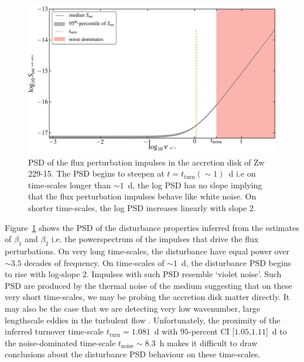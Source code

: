\documentclass[a4paper,fleqn,usenatbib]{mnras}
\begin{document}
\begin{figure}
    \includegraphics[width=\columnwidth]{images/Zw229-15_distPSD.jpg}
    \caption{PSD of the flux perturbation impulses in the accretion disk of Zw 229-15. The PSD begins to steepen at $t = t_{\mathrm{turn}} (\sim 1)$~d i.e on time-scales longer than $\sim 1$~d, the log PSD has no slope implying that the flux perturbation impulses behave like white noise. On shorter time-scales, the log PSD increases linearly with slope $2$.}
    \label{fig:Zw229-15_distPSD}
\end{figure}

Figure~\ref{fig:Zw229-15_distPSD} shows the PSD of the disturbance properties inferred from the estimates of $\beta_{1}$ and $\beta_{2}$ i.e. the powerspectrum of the impulses that drive the flux perturbations. On very long time-scales, the disturbance have equal power over $\sim 3.5$ decades of frequency. On time-scales of $\sim 1$~d, the disturbance PSD begins to rise with log-slope $2$. Impulses with such PSD resemble `violet noise'. Such PSD are produced by the thermal noise of the medium \citep{Mellen52} suggesting that on these very short time-scales, we may be probing the accretion disk matter directly. It may also be the case that we are detecting very low wavenumber, large lengthscale eddies in the turbulent flow \citep{EddySim15}. Unfortunately, the proximity of the inferred turnover time-scale $t_{\mathrm{turn}} = 1.081$~d with $95$-percent CI [$1.05$,$1.11$]~d to the noise-dominated time-scale $t_{\mathrm{noise}} \sim 8.3$~h makes it difficult to draw conclusions about the disturbance PSD behaviour on these time-scales.
\end{document}
